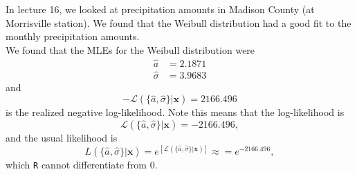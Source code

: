 \documentclass{article}\usepackage[]{graphicx}\usepackage[]{xcolor}
\begin{document}
In lecture 16, we looked at precipitation amounts in Madison County (at 
Morrisville station). We found that the Weibull distribution had a good fit
to the monthly precipitation amounts.\\

We found that the MLEs for the Weibull distribution were 
\begin{align*}
    \hat{a}&=2.1871\\
    \hat{\sigma}&=3.9683
\end{align*}
and
\[-\mathcal{L}(\{\hat{a}, \hat{\sigma}\}|\mathbf{x}) = 2166.496\]
is the realized negative log-likelihood.
Note this means that the log-likelihood is
\[\mathcal{L}(\{\hat{a}, \hat{\sigma}\}|\mathbf{x}) = -2166.496,\]
and the usual likelihood is
\[L(\{\hat{a}, \hat{\sigma}\}|\mathbf{x}) = e^{\left[\mathcal{L}(\{\hat{a}, \hat{\sigma}\}|\mathbf{x})\right]} \approx = e^{-2166.496},\]
which \texttt{R} cannot differentiate from 0.
\end{document}
